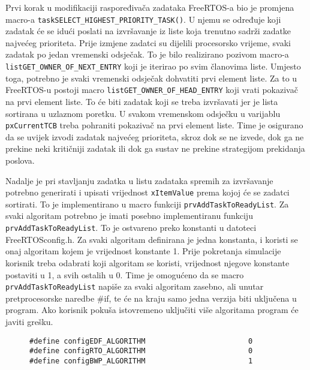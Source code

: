 \documentclass[../zavrsni.tex]{subfiles}
\begin{document}
Prvi korak u modifikaciji raspoređivača zadataka FreeRTOS-a bio je promjena macro-a \texttt{taskSELECT\_HIGHEST\_PRIORITY\_TASK()}.
U njemu se određuje koji zadatak će se idući poslati na izvršavanje iz liste koja trenutno sadrži zadatke najvećeg prioriteta.
Prije izmjene zadatci su dijelili procesorsko vrijeme, svaki zadatak po jedan vremenski odsječak. To je bilo realizirano pozivom
macro-a \texttt{listGET\_OWNER\_OF\_NEXT\_ENTRY} koji je iterirao po svim članovima liste. Umjesto toga, potrebno je svaki vremenski odsječak
dohvatiti prvi element liste. Za to u FreeRTOS-u postoji macro \texttt{listGET\_OWNER\_OF\_HEAD\_ENTRY} koji vrati pokazivač na 
prvi element liste. To će biti zadatak koji se treba izvršavati jer je lista sortirana u uzlaznom poretku. 
U svakom vremenskom odsječku u varijablu \texttt{pxCurrentTCB} treba pohraniti pokazivač na prvi element liste. Time je osigurano da
se uvijek izvodi zadatak najvećeg prioriteta, skroz dok se ne izvede, dok ga ne prekine neki kritičniji zadatak ili dok ga sustav 
ne prekine strategijom prekidanja poslova.


Nadalje je pri stavljanju zadatka u listu zadataka spremih za izvršavanje potrebno generirati i upisati vrijednost \texttt{xItemValue}
prema kojoj će se zadatci sortirati. To je implementirano u macro funkciji \texttt{prvAddTaskToReadyList}. Za svaki algoritam 
potrebno je imati posebno implementiranu funkciju \texttt{prvAddTaskToReadyList}. To je ostvareno preko konstanti u datoteci 
FreeRTOSconfig.h. Za svaki algoritam definirana je jedna konstanta, i koristi se onaj algoritam kojem je vrijednost konstante 1.
Prije pokretanja simulacije korisnik treba odabrati koji algoritam se koristi, vrijednost njegove konstante postaviti u 1, a svih 
ostalih u 0. Time je omogućeno da se macro \texttt{prvAddTaskToReadyList} napiše za svaki algoritam zasebno, ali unutar pretprocesorske
naredbe \#if, te će na kraju samo jedna verzija biti uključena u program. Ako korisnik pokuša istovremeno uključiti više 
algoritama program će javiti grešku.

\begin{figure}[h]
\centering
\begin{lstlisting}[style=CStyle,caption={Primjer uključenja algoritma BWP},captionpos=b]
#define configEDF_ALGORITHM                        0
#define configRTO_ALGORITHM                        0
#define configBWP_ALGORITHM                        1
\end{lstlisting}
\end{figure}
\end{document}

